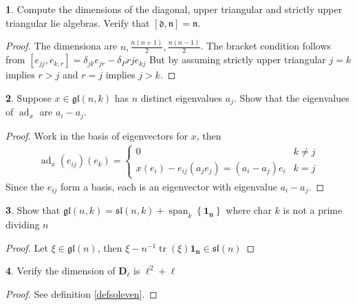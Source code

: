\documentclass[10.5pt]{article}
\theoremstyle{definition}
\newtheorem{pb}{}
\numberwithin{example}{subsection}
\numberwithin{proposition}{subsection}
\numberwithin{pb}{subsection}
\newcommand{\set}[1]{\left\{#1\right\}}
\begin{document}
        \begin{pb}
            Compute the dimensions of the diagonal, upper triangular and strictly upper triangular lie algebras. Verify that \([\mathfrak{d},\mathfrak{n}] = \mathfrak{n}\).
            \begin{proof}
                The dimensiona are \(n, \frac{n(n+1)}{2}, \frac{n(n-1)}{2}\). The bracket condition follows from \([e_{jj},e_{k,r}] = \delta_{jk}e_{jr} - \delta_P{rj}e_{kj}\) But by assuming strictly upper triangular \(j = k\) implies \(r > j\) and \(r = j\) implies \(j > k\).
            \end{proof}
        \end{pb}
        \begin{pb}
            Suppose \(x \in \mathfrak{gl}(n,k)\) has \(n\) distinct eigenvalues \(a_j\). Show that the eigenvalues of \(\operatorname{ad}_x\) are \(a_i - a_j\).

            \begin{proof}
                Work in the basis of eigenvectors for \(x\), then
                \begin{align}
                    \operatorname{ad}_x(e_{ij})(e_k) = \begin{cases}
                        0 & k \neq j \\
                        x(e_i) - e_{ij}(a_je_j) = (a_i - a_j)e_i & k = j
                    \end{cases}
                \end{align}
                Since the \(e_{ij}\) form a basis, each is an eigenvector with eigenvalue \(a_i - a_j\).
            \end{proof}
        \end{pb}
        \begin{pb}
            Show that \(\mathfrak{gl}(n,k) = \mathfrak{sl}(n,k) + \operatorname{span}_k\set{\mathbf{1_n}}\) where char \(k\) is not a prime dividing \(n\)

            \begin{proof}
                Let \(\xi \in \mathfrak{gl}(n)\), then \(\xi - n^{-1}\operatorname{tr}(\xi)\mathbf{1_n} \in \mathfrak{sl}(n)\)
            \end{proof}
        \end{pb}
        \begin{pb}
            Verify the dimension of \(\mathbf{D_\ell}\) is \(\ell^2 + \ell\)
            \begin{proof}
                See definition \ref{defsoleven}.
            \end{proof}
        \end{pb}
\end{document}
